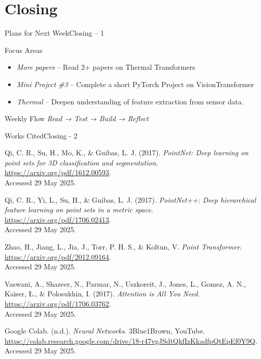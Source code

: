 \documentclass{beamer}
\begin{document}
	\section{Closing}
		\begin{frame}{Plans for Next Week}{Closing – 1}
			\begin{block}{Focus Areas}
				\vspace{-0.3em}
				\begin{itemize}
					\item \textit{More papers} – Read 2+ papers on Thermal Transformers 
					\item \textit{Mini Project \#3} – Complete a short PyTorch Project on VisionTransformer
					\item \textit{Thermal} – Deepen understanding of feature extraction from sensor data.
				\end{itemize}
			\end{block}
			\vspace{1em}
			\begin{block}{Weekly Flow}
				\textit{Read → Test → Build → Reflect}
			\end{block}
		\end{frame}
		
		\begin{frame}[allowframebreaks]{Works Cited}{Closing - 2}
			\begin{thebibliography}{}\small
				Qi, C. R., Su, H., Mo, K., \& Guibas, L. J. (2017). \textit{PointNet: Deep learning on point sets for 3D classification and segmentation}.\\
				\url{https://arxiv.org/pdf/1612.00593}.\\
				Accessed 29 May 2025.
				
				Qi, C. R., Yi, L., Su, H., \& Guibas, L. J. (2017). \textit{PointNet++: Deep hierarchical feature learning on point sets in a metric space}.\\
				\url{https://arxiv.org/pdf/1706.02413}.\\
				Accessed 29 May 2025.
				
				Zhao, H., Jiang, L., Jia, J., Torr, P. H. S., \& Koltun, V. \textit{Point Transformer}.\\
				\url{https://arxiv.org/pdf/2012.09164}.\\
				Accessed 29 May 2025.
				
				Vaswani, A., Shazeer, N., Parmar, N., Uszkoreit, J., Jones, L., Gomez, A. N., Kaiser, Ł., \& Polosukhin, I. (2017).
				\textit{Attention is All You Need}.\\
				\url{https://arxiv.org/pdf/1706.03762}.\\
				Accessed 29 May 2025.
				
				Google Colab. (n.d.). \textit{Neural Networks}. 3Blue1Brown, YouTube.\\
				\url{https://colab.research.google.com/drive/18-r47vgJSdtQkfIzKkadfpQtEpEf0Y9Q}.\\
				Accessed 29 May 2025.
				
			\end{thebibliography}
		\end{frame}
\end{document}
